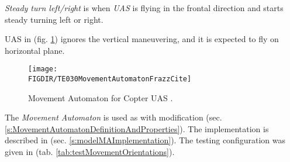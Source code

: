 \emph{Steady turn left/right} is when \emph{UAS} is flying in the frontal direction and starts steady turning left or right. 

\begin{note}
UAS in (fig. \ref{fig:movementAutomatonExampleTheory}) ignores the vertical maneuvering, and it is expected to fly on horizontal plane.
\end{note}


\begin{figure}[H]
    \centering
    \texttt{[image: \\FIGDIR/TE030MovementAutomatonFrazzCite]} 
    \caption{Movement Automaton for Copter UAS \cite{frazzoli2001robust}.}
    \label{fig:movementAutomatonExampleTheory}
\end{figure}

\begin{note}
The \emph{Movement Automaton} is used as with modification (sec. \ref{s:MovementAutomatonDefinitionAndProperties}). The implementation is described in (sec. \ref{s:modelMAImplementation}). The testing configuration was given in (tab. \ref{tab:testMovementOrientations}).
\end{note}

